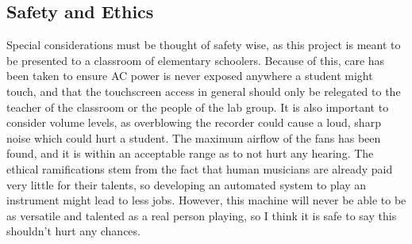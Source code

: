 \documentclass[UTF8, 12pt]{article}
\begin{document}
\subsection{Safety and Ethics}
    Special considerations must be thought of safety wise, as this project is meant to be presented to a classroom of elementary schoolers. Because of this, care has been taken to ensure AC power is never exposed anywhere a student might touch, and that the touchscreen access in general should only be relegated to the teacher of the classroom or the people of the lab group. It is also important to consider volume levels, as overblowing the recorder could cause a loud, sharp noise which could hurt a student. The maximum airflow of the fans has been found, and it is within an acceptable range as to not hurt any hearing. The ethical ramifications stem from the fact that human musicians are already paid very little for their talents, so developing an automated system to play an instrument might lead to less jobs. However, this machine will never be able to be as versatile and talented as a real person playing, so I think it is safe to say this shouldn't hurt any chances.

\newpage
\printbibliography
\end{document}
